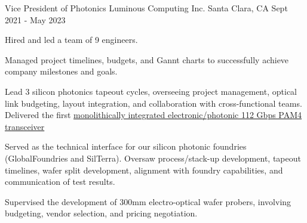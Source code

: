 

\begin{cventries}
    
  \cventry
    {Vice President of Photonics} %
    {Luminous Computing Inc.}
    {Santa Clara, CA} %
    {Sept 2021 - May 2023} %
    {
      \begin{cvitems} %
        \item {Hired and led a team of 9 engineers.}
        \item {Managed project timelines, budgets, and Gannt charts to successfully achieve company milestones and goals.}
        \item {Lead 3 silicon photonics tapeout cycles, overseeing project management, optical link budgeting, layout integration, and collaboration with cross-functional teams. Delivered the first \href{https://preprints.opticaopen.org/articles/preprint/Monolithically_integrated_112_Gbps_PAM4_optical_transmitter_and_receiver_in_a_45nm_CMOS-silicon_photonics_process/22814837}{monolithically integrated electronic/photonic 112 Gbps PAM4 transceiver}}
        \item {Served as the technical interface for our silicon photonic foundries (GlobalFoundries and SilTerra). Oversaw process/stack-up development, tapeout timelines, wafer split development, alignment with foundry capabilities, and communication of test results.}
        \item {Supervised the development of 300mm electro-optical wafer probers, involving budgeting, vendor selection, and pricing negotiation.}
      \end{cvitems}
    }


\end{cventries}
